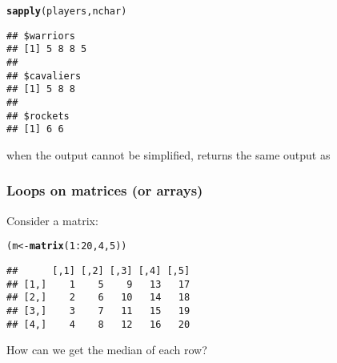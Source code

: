 \documentclass[12pt]{beamer}\usepackage[]{graphicx}\usepackage[]{color}
\makeatletter
\newcommand{\hlnum}[1]{\textcolor[rgb]{0.686,0.059,0.569}{#1}}%
\newcommand{\hlopt}[1]{\textcolor[rgb]{0,0,0}{#1}}%
\newcommand{\hlstd}[1]{\textcolor[rgb]{0.345,0.345,0.345}{#1}}%
\newcommand{\hlkwb}[1]{\textcolor[rgb]{0.69,0.353,0.396}{#1}}%
\newcommand{\hlkwd}[1]{\textcolor[rgb]{0.737,0.353,0.396}{\textbf{#1}}}%
\newenvironment{kframe}{%
 \def\at@end@of@kframe{}%
 \ifinner\ifhmode%
  \def\at@end@of@kframe{\end{minipage}}%
  \begin{minipage}{\columnwidth}%
 \fi\fi%
 \def\FrameCommand##1{\hskip\@totalleftmargin \hskip-\fboxsep
 \colorbox{shadecolor}{##1}\hskip-\fboxsep
     \hskip-\linewidth \hskip-\@totalleftmargin \hskip\columnwidth}%
 \MakeFramed {\advance\hsize-\width
   \@totalleftmargin\z@ \linewidth\hsize
   \@setminipage}}%
 {\par\unskip\endMakeFramed%
 \at@end@of@kframe}
\newenvironment{knitrout}{}{} %
\makeatother
\begin{document}
\begin{frame}[fragile]
\frametitle{}

\begin{knitrout}\footnotesize
{}\color{fgcolor}\begin{kframe}
\begin{alltt}
\hlkwd{sapply}\hlstd{(players, nchar)}
\end{alltt}
\begin{verbatim}
## $warriors
## [1] 5 8 8 5
## 
## $cavaliers
## [1] 5 8 8
## 
## $rockets
## [1] 6 6
\end{verbatim}
\end{kframe}
\end{knitrout}

when the output cannot be simplified,  returns the same output as 

\end{frame}


\begin{frame}
\begin{center}
\Huge{}
\end{center}
\end{frame}


\begin{frame}[fragile]
\frametitle{Loops on matrices (or arrays)}

Consider a matrix:
\begin{knitrout}\footnotesize
{}\color{fgcolor}\begin{kframe}
\begin{alltt}
\hlstd{(m} \hlkwb{<-} \hlkwd{matrix}\hlstd{(}\hlnum{1}\hlopt{:}\hlnum{20}\hlstd{,} \hlnum{4}\hlstd{,} \hlnum{5}\hlstd{))}
\end{alltt}
\begin{verbatim}
##      [,1] [,2] [,3] [,4] [,5]
## [1,]    1    5    9   13   17
## [2,]    2    6   10   14   18
## [3,]    3    7   11   15   19
## [4,]    4    8   12   16   20
\end{verbatim}
\end{kframe}
\end{knitrout}

How can we get the median of each row?

\end{frame}
\end{document}
